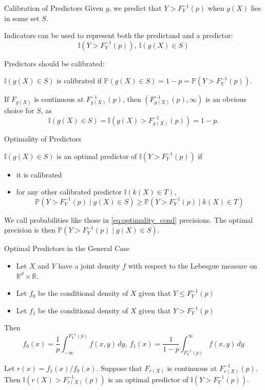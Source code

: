 \documentclass{beamer}
\def\I{\mathbb I}
\def\P{\mathbb P}
\def\R{\mathbb R}
\begin{document}
\begin{frame}{Calibration of Predictors}
    Given $g$, we predict that $Y > F_Y^{-1}(p)$ when $g(X)$ lies in some set $S$.

    Indicators can be used to represent both the predictand and a predictor:
    \[
    \I(Y > F_Y^{-1}(p)), \ \I(g(X) \in S)
    \]

    Predictors should be calibrated:
    \begin{definition}
        $\I(g(X) \in S)$ is calibrated if $\P(g(X) \in S) = 1 - p = \P(Y > F_Y^{-1}(p))$.
    \end{definition}
    If $F_{g(X)}$ is continuous at $F_{g(X)}^{-1}(p)$, then $(F_{g(X)}^{-1}(p), \infty)$ is an obvious choice for $S$, as
    \[
    \I(g(X) \in S) = \I(g(X) > F_{g(X)}^{-1}(p)) = 1 - p.
    \]
\end{frame}

\begin{frame}{Optimality of Predictors}
    \begin{definition}
        $\I(g(X) \in S)$ is an optimal predictor of $\I(Y > F_Y^{-1}(p))$ if
        \begin{itemize}
            \item it is calibrated
            \item for any other calibrated predictor $\I(k(X) \in T)$,
            \begin{equation}\label{eq:optimality_cond}
                \P(Y > F_Y^{-1}(p) \mid g(X) \in S) \ge \P(Y > F_Y^{-1}(p) \mid k(X) \in T)
            \end{equation}
        \end{itemize}
    \end{definition}
    We call probabilities like those in \eqref{eq:optimality_cond} precisions. The optimal precision is then $\P(Y > F_Y^{-1}(p) \mid g(X) \in S)$.
\end{frame}

\begin{frame}{Optimal Predictors in the General Case}
    \begin{itemize}
        \item Let $X$ and $Y$ have a joint density $f$ with respect to the Lebesgue measure on $\R^d \times \mathbb{R}$.
        \item Let $f_0$ be the conditional density of $X$ given that $Y \le F_Y^{-1}(p)$
        \item Let $f_1$ be the conditional density of $X$ given that $Y > F_Y^{-1}(p)$
    \end{itemize}
    Then
    \[
    f_0(x) = \frac{1}{p}\int_{-\infty}^{F_Y^{-1}(p)} f(x, y)\,dy, \
    f_1(x) = \frac{1}{1 - p}\int_{F_Y^{-1}(p)}^{\infty} f(x, y)\,dy
    \]
    \begin{theorem}
        Let $r(x) = f_1(x) / f_0(x)$. Suppose that $F_{r(X)}$ is continuous at $F_{r(X)}^{-1}(p)$. Then $\I(r(X) > F_{r(X)}^{-1}(p))$ is an optimal predictor of $\I(Y > F_Y^{-1}(p))$.
    \end{theorem}
\end{frame}
\end{document}
